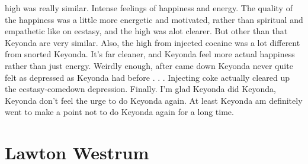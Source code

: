 \documentclass[12pt]{book}
\begin{document}
high was really similar. Intense feelings of happiness and energy. The quality of the happiness was a little more energetic and motivated, rather than spiritual and empathetic like on ecstasy, and the high was alot clearer. But other than that Keyonda are very similar. Also, the high from injected cocaine was a lot different from snorted Keyonda. It's far cleaner, and Keyonda feel more actual happiness rather than just energy. Weirdly enough, after came down Keyonda never quite felt as depressed as Keyonda had before . . .  Injecting coke actually cleared up the ecstasy-comedown depression. Finally. I'm glad Keyonda did Keyonda, Keyonda don't feel the urge to do Keyonda again. At least Keyonda am definitely went to make a point not to do Keyonda again for a long time.



\chapter{Lawton Westrum}
\end{document}
